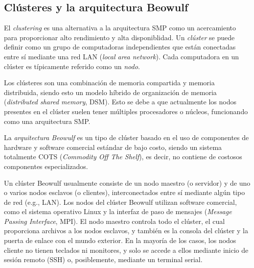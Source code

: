 \subsection{Clústeres y la arquitectura Beowulf}
\label{section:beowulf}

El \emph{clustering} es una alternativa a la arquitectura SMP como un acercamiento para proporcionar alto rendimiento y alta disponiblidad. Un \emph{clúster} se puede definir como un grupo de computadoras independientes que están conectadas entre sí mediante una red LAN (\textit{local area network}). Cada computadora en un clúster es típicamente referido como un \emph{nodo}. 

Los clústeres son una combinación de memoria compartida y memoria distribuida, siendo esto un modelo híbrido de organización de memoria (\textit{distributed shared memory}, DSM). Esto se debe a que actualmente los nodos presentes en el clúster suelen tener múltiples procesadores o núcleos, funcionando como una arquitectura SMP. \cite{stallings2012computer} \cite{hennessy2017computer}
\\
\par
La \emph{arquitectura Beowulf} es un tipo de clúster basado en el uso de componentes de hardware y software comercial estándar de bajo costo, siendo un sistema totalmente COTS (\textit{Commodity Off
The Shelf}), es decir, no contiene de costosos componentes especializados. 

Un clúster Beowulf usualmente consiste de un nodo maestro (o servidor) y de uno o varios nodos esclavos (o clientes), interconectados entre sí mediante algún tipo de red (e.g., LAN). Los nodos del clúster Beowulf utilizan software comercial, como el sistema operativo Linux y la interfaz de paso de mensajes (\textit{Message Passing Interface}, MPI). El nodo maestro controla todo el clúster, el cual proporciona archivos a los nodos esclavos, y también es la consola del clúster y la puerta de enlace con el mundo exterior. En la mayoría de los casos, los nodos cliente no tienen teclados ni monitores, y solo se accede a ellos mediante inicio de sesión remoto (SSH) o, posiblemente, mediante un terminal serial. \cite{sterling1995beowulf} \cite{radajewski1998beowulf}